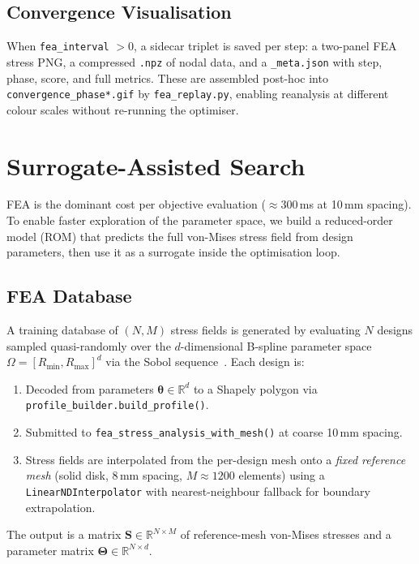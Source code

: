 \documentclass[10pt,twocolumn]{article}
\begin{document}
\subsection{Convergence Visualisation}
\label{sec:gif}

When \texttt{fea\_interval} $> 0$, a sidecar triplet is saved per step:
a two-panel FEA stress PNG, a compressed \texttt{.npz} of nodal data, and a
\texttt{\_meta.json} with step, phase, score, and full metrics.  These are
assembled post-hoc into \texttt{convergence\_phase*.gif} by
\texttt{fea\_replay.py}, enabling reanalysis at different colour scales
without re-running the optimiser.

\section{Surrogate-Assisted Search}
\label{sec:rom}

FEA is the dominant cost per objective evaluation (${\approx}300$\,ms at
10\,mm spacing).  To enable faster exploration of the parameter space, we
build a reduced-order model (ROM) that predicts the full von-Mises stress
field from design parameters, then use it as a surrogate inside the
optimisation loop.

\subsection{FEA Database}
\label{sec:fea_database}

A training database of $(N, M)$ stress fields is generated by evaluating
$N$ designs sampled quasi-randomly over the $d$-dimensional B-spline
parameter space $\Omega = [R_{\min}, R_{\max}]^d$ via the Sobol
sequence~\cite{sobol1967}.  Each design is:
\begin{enumerate}
  \item Decoded from parameters $\boldsymbol{\theta} \in \mathbb{R}^d$ to a
        Shapely polygon via \texttt{profile\_builder.build\_profile()}.
  \item Submitted to \texttt{fea\_stress\_analysis\_with\_mesh()} at coarse
        10\,mm spacing.
  \item Stress fields are interpolated from the per-design mesh onto a
        \emph{fixed reference mesh} (solid disk, 8\,mm spacing,
        $M{\approx}1200$ elements) using a \texttt{LinearNDInterpolator}
        with nearest-neighbour fallback for boundary extrapolation.
\end{enumerate}
The output is a matrix $\mathbf{S} \in \mathbb{R}^{N \times M}$ of
reference-mesh von-Mises stresses and a parameter matrix
$\boldsymbol{\Theta} \in \mathbb{R}^{N \times d}$.
\end{document}
